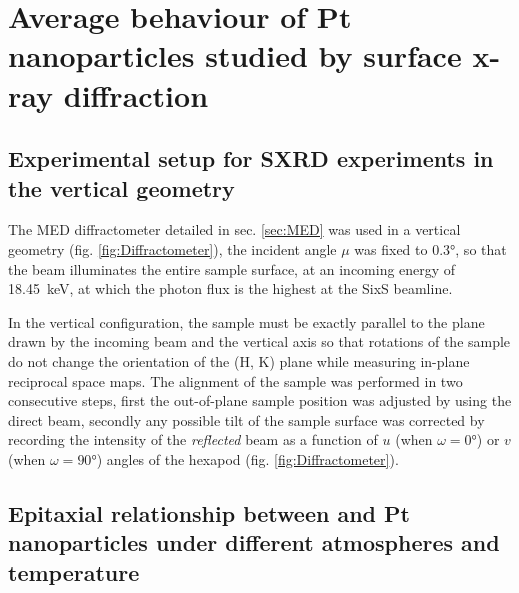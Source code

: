 \section{Average behaviour of Pt nanoparticles studied by surface x-ray diffraction}


\subsection{Experimental setup for SXRD experiments in the vertical geometry}\label{sec:SXRDSetupV}

The MED diffractometer detailed in sec. \ref{sec:MED} was used in a vertical geometry (fig. \ref{fig:Diffractometer}), the incident angle $\mu$ was fixed to \ang{0.3}, so that the beam illuminates the entire sample surface, at an incoming energy of \qty{18.45}{\keV}, at which the photon flux is the highest at the SixS beamline.

In the vertical configuration, the sample must be exactly parallel to the plane drawn by the incoming beam and the vertical axis so that rotations of the sample do not change the orientation of the (H, K) plane while measuring in-plane reciprocal space maps.
The alignment of the sample was performed in two consecutive steps, first the out-of-plane sample position was adjusted by using the direct beam, secondly any possible tilt of the sample surface was corrected by recording the intensity of the \textit{reflected} beam as a function of $u$ (when $\omega=\ang{0}$) or $v$ (when $\omega=\ang{90}$) angles of the hexapod (fig. \ref{fig:Diffractometer}).

\subsection{Epitaxial relationship between  and Pt nanoparticles under different atmospheres and temperature}

